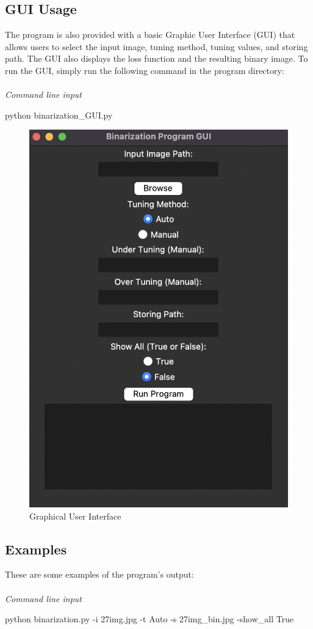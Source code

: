 \begin{multicols}{2}
\subsection{GUI Usage}


The program is also provided with a basic Graphic User Interface (GUI) that allows users to select the input image, tuning method, tuning values, and storing path. The GUI also displays the loss function and the resulting binary image. To run the GUI, simply run the following command in the program directory:
\\
\\
\textit{Command line input}

\begin{bashscript}
    python binarization\_GUI.py
\end{bashscript}

\begin{figure}[H]
    \centering
    \includegraphics[width=0.5\columnwidth]{../Images/examples/GUI.png}
    \caption{Graphical User Interface}
    \label{fig-0}
\end{figure}


\subsection{Examples}

These are some examples of the program's output:\\
\\
\textit{Command line input}

\begin{bashscript}
    python binarization.py -i 27img.jpg -t Auto -s 27img_bin.jpg -show_all True
\end{bashscript}


\end{multicols}
